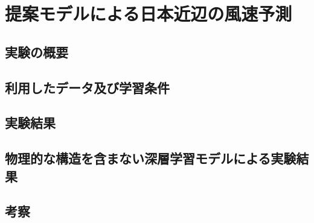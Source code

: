 \chapter{提案モデルによる日本近辺の風速予測}
\section{実験の概要}

\section{利用したデータ及び学習条件}

\section{実験結果}

\section{物理的な構造を含まない深層学習モデルによる実験結果}

\section{考察}